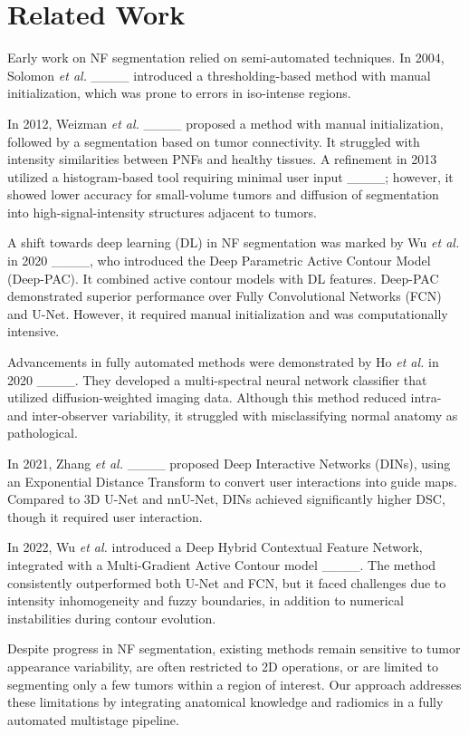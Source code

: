 \section{Related Work}
\label{sec:related work}

Early work on NF segmentation relied on semi-automated techniques. In 2004, Solomon \textit{et al.} ____ introduced a thresholding-based method with manual initialization, which was prone to errors in iso-intense regions. 

In 2012, Weizman \textit{et al.} ____ proposed a method with manual initialization, followed by a segmentation based on tumor connectivity. It struggled with intensity similarities between PNFs and healthy tissues. A refinement in 2013 utilized a histogram-based tool requiring minimal user input ____; however, it showed lower accuracy for small-volume tumors and diffusion of segmentation into high-signal-intensity structures adjacent to tumors.

A shift towards deep learning (DL) in NF segmentation was marked by Wu \textit{et al.} in 2020 ____, who introduced the Deep Parametric Active Contour Model (Deep-PAC). It combined active contour models with DL features. Deep-PAC demonstrated superior performance over Fully Convolutional Networks (FCN) and U-Net. However, it required manual initialization and was computationally intensive. 

Advancements in fully automated methods were demonstrated by Ho \textit{et al.} in 2020 ____. They developed a multi-spectral neural network classifier that utilized diffusion-weighted imaging data. Although this method reduced intra- and inter-observer variability, it struggled with misclassifying normal anatomy as pathological. 

In 2021, Zhang \textit{et al.} ____ proposed Deep Interactive Networks (DINs), using an Exponential Distance Transform to convert user interactions into guide maps. Compared to 3D U-Net and nnU-Net, DINs achieved significantly higher DSC, though it required user interaction.

In 2022, Wu \textit{et al.} introduced a Deep Hybrid Contextual Feature Network, integrated with a Multi-Gradient Active Contour model ____. The method consistently outperformed both U-Net and FCN, but it faced challenges due to intensity inhomogeneity and fuzzy boundaries, in addition to numerical instabilities during contour evolution. 

Despite progress in NF segmentation, existing methods remain sensitive to tumor appearance variability, are often restricted to 2D operations, or are limited to segmenting only a few tumors within a region of interest. Our approach addresses these limitations by integrating anatomical knowledge and radiomics in a fully automated multistage pipeline.
